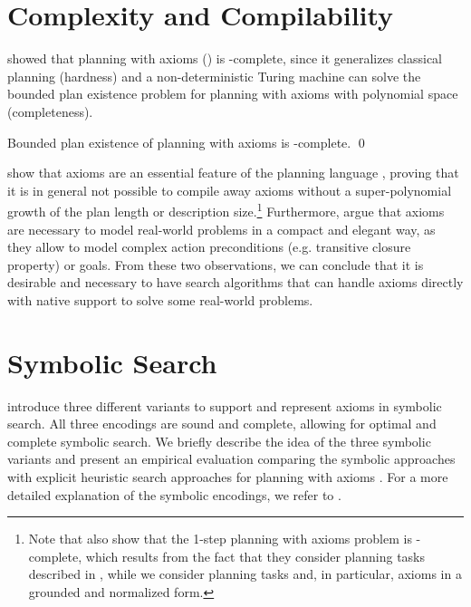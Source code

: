 \section{Complexity and Compilability}

\textcite{helmert-2008} showed that planning with axioms () is \PSPACE-complete, since it generalizes classical planning (hardness) and a non-deterministic Turing machine can solve the bounded plan existence problem for planning with axioms with polynomial space (completeness).

\begin{theorem}
    Bounded plan existence of planning with axioms is \PSPACE-complete. \qed
\end{theorem}

\textcite{thiebaux-et-al-aij2005} show that axioms are an essential feature of the planning language \pddl{} \autocite{mcdermott-et-al-tr1998,hoffmann-edelkamp-jair2005}, proving that it is in general not possible to compile away axioms without a super-polynomial growth of the plan length or description size.\footnote{Note that \textcite{thiebaux-et-al-aij2005} also show that the 1-step planning with axioms problem is \EXPTIME{}-complete, which results from the fact that they consider planning tasks described in \pddl{}, while we consider planning tasks and, in particular, axioms in a grounded and normalized form.}
Furthermore, \textcite{thiebaux-et-al-aij2005} argue that axioms are necessary to model real-world problems in a compact and elegant way, as they allow to
model complex action preconditions (e.g. transitive closure property) or goals.
From these two observations, we can conclude that it is desirable and necessary to have search algorithms that can handle axioms directly with native support to solve some real-world problems.

\section{Symbolic Search}

\textcite{speck-et-al-icaps2019} introduce three different variants to support and represent axioms in symbolic search. All three encodings are sound and complete, allowing for optimal and complete symbolic search. We briefly describe the idea of the three symbolic variants and present an empirical evaluation comparing the symbolic approaches \autocite{speck-et-al-icaps2019} with explicit heuristic search approaches for planning with axioms \autocite{ivankovic-haslum-ijcai2015}. 
For a more detailed explanation of the symbolic encodings, we refer to \textcite{speck-et-al-icaps2019}.

